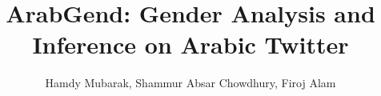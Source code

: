 \documentclass[sigconf,authorversion,nonacm]{acmart}
\begin{document}
\title{ArabGend: Gender Analysis and Inference on Arabic Twitter}




\author{Hamdy Mubarak, Shammur Absar Chowdhury, Firoj Alam}


         



\end{document}
